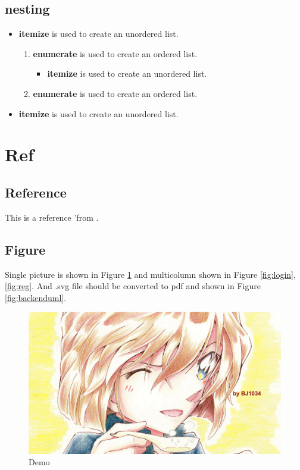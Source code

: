 \documentclass[twoside,11pt]{article}
\begin{document}
\subsection{nesting}
\begin{itemize}
    \item \textbf{itemize} is used to create an unordered list.
          \begin{enumerate}
              \item \textbf{enumerate} is used to create an ordered list.
                    \begin{itemize}
                        \item \textbf{itemize} is used to create an unordered list.
                    \end{itemize}
              \item \textbf{enumerate} is used to create an ordered list.
          \end{enumerate}
    \item \textbf{itemize} is used to create an unordered list.

\end{itemize}
\newpage


\section{Ref}

\subsection{Reference}
This is a reference 'from \cite{BOOK}.

\subsection{Figure}

Single picture is shown in Figure \ref{fig:demo} and multicolumn shown in Figure \ref{fig:login}, \ref{fig:reg}. And .svg file should be converted to pdf and shown in Figure \ref{fig:backenduml}.

\begin{figure}[H]
    \centering
    \includegraphics[width=0.8\columnwidth]{figures/demo.png}
    \caption{Demo}
    \label{fig:demo}
\end{figure}
\end{document}
